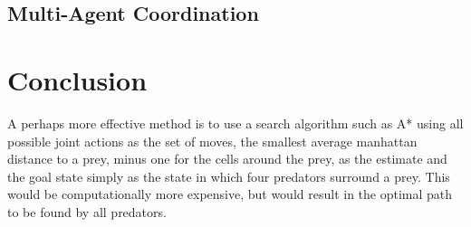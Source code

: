 \documentclass[10pt]{article}
\begin{document}
\subsection{Multi-Agent Coordination}

\section{Conclusion}\label{conclusion}
%



A perhaps more effective method is to use a search algorithm such as A* using all possible joint actions as the set of moves, the smallest average manhattan distance to a prey, minus one for the cells around the prey, as the estimate and the goal state simply as the state in which four predators surround a prey. This would be computationally more expensive, but would result in the optimal path to be found by all predators.



 \pagebreak

  
 
 \pagebreak
 \appendix
\end{document}
